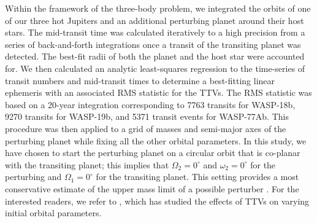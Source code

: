 Within the framework of the three-body problem, we integrated the orbits of one of our three hot Jupiters and an additional perturbing planet around their host stars. The mid-transit time was calculated iteratively to a high precision from a series of back-and-forth integrations once a transit of the transiting planet was detected. The best-fit radii of both the planet and the host star were accounted for. We then calculated an analytic least-squares regression to the time-series of transit numbers and mid-transit times to determine a best-fitting linear ephemeris with an associated RMS statistic for the TTVs. The RMS statistic was based on a 20-year integration corresponding to 7763 transits for WASP-18b, 9270 transits for WASP-19b, and 5371 transit events for WASP-77Ab. This procedure was then applied to a grid of masses and semi-major axes of the perturbing planet while fixing all the other orbital parameters. In this study, we have chosen to start the perturbing planet on a circular orbit that is co-planar with the transiting planet; this implies that $\Omega_2=0^{\circ}$ and $\omega_2=0^{\circ}$ for the perturbing and $\Omega_1 = 0^{\circ}$ for the transiting planet. This setting provides a most conservative estimate of the upper mass limit of a possible perturber \citep{bean2009, fukui2011, Hoyer2011, Hoyer2012}. For the interested readers, we refer to \citet{TEMP4}, which has studied the effects of TTVs on varying initial orbital parameters.

